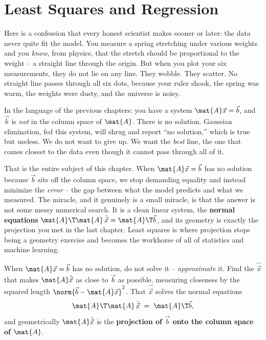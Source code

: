 \chapter{Least Squares and Regression}

Here is a confession that every honest scientist makes sooner or later: the data never quite fit
the model. You measure a spring stretching under various weights and you \emph{know}, from physics,
that the stretch should be proportional to the weight -- a straight line through the origin. But
when you plot your six measurements, they do not lie on any line. They wobble. They scatter. No
straight line passes through all six dots, because your ruler shook, the spring was warm, the
weights were dusty, and the universe is noisy.

In the language of the previous chapters: you have a system $\mat{A}\vec{x}=\vec{b}$, and
$\vec{b}$ is \emph{not} in the column space of $\mat{A}$. There is no solution. Gaussian
elimination, fed this system, will shrug and report ``no solution,'' which is true but useless.
We do not want to give up. We want the \emph{best} line, the one that comes closest to the data
even though it cannot pass through all of it.

That is the entire subject of this chapter. When $\mat{A}\vec{x}=\vec{b}$ has no solution because
$\vec{b}$ sits off the column space, we stop demanding equality and instead minimize the
\emph{error} -- the gap between what the model predicts and what we measured. The miracle, and it
genuinely is a small miracle, is that the answer is not some messy numerical search. It is a clean
linear system, the \textbf{normal equations} $\mat{A}\T\mat{A}\,\hat{\vec{x}}=\mat{A}\T\vec{b}$,
and its geometry is exactly the projection you met in the last chapter. Least squares is where
projection stops being a geometry exercise and becomes the workhorse of all of statistics and
machine learning.

\begin{focusbox}
When $\mat{A}\vec{x}=\vec{b}$ has no solution, do not solve it -- \emph{approximate} it. Find the
$\hat{\vec{x}}$ that makes $\mat{A}\hat{\vec{x}}$ as close to $\vec{b}$ as possible, measuring
closeness by the squared length $\norm{\vec{b}-\mat{A}\vec{x}}^2$. That $\hat{\vec{x}}$ solves
the normal equations
\[
  \mat{A}\T\mat{A}\,\hat{\vec{x}} \;=\; \mat{A}\T\vec{b},
\]
and geometrically $\mat{A}\hat{\vec{x}}$ is the \textbf{projection of $\vec{b}$ onto the column
space of $\mat{A}$}.
\end{focusbox}

